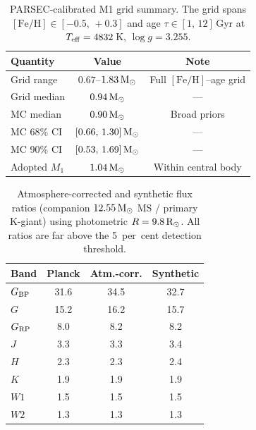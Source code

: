 \documentclass[usenatbib,fleqn]{mnras}
\newcommand{\Msun}{{\rm M}_\odot}
\newcommand{\Rsun}{{\rm R}_\odot}
\begin{document}

\begin{table}
\centering
\caption{PARSEC-calibrated M1 grid summary.  The grid spans
$[\mathrm{Fe/H}] \in [-0.5,\,+0.3]$ and age $\tau \in [1,\,12]\,$Gyr
at $T_{\rm eff} = 4832\,$K, $\log g = 3.255$.}
\label{tab:parsec_grid}
\begin{tabular}{lcc}
\toprule
Quantity & Value & Note \\
\midrule
Grid range       & $0.67$--$1.83\,\Msun$ & Full $[\mathrm{Fe/H}]$--age grid \\
Grid median      & $0.94\,\Msun$          & --- \\
MC median        & $0.90\,\Msun$          & Broad priors \\
MC 68\% CI       & $[0.66,\,1.30]\,\Msun$ & --- \\
MC 90\% CI       & $[0.53,\,1.69]\,\Msun$ & --- \\
Adopted $M_1$    & $1.04\,\Msun$          & Within central body \\
\bottomrule
\end{tabular}
\end{table}

\begin{table}
\centering
\caption{Atmosphere-corrected and synthetic flux ratios (companion
$12.55\,\Msun$ MS / primary K-giant) using photometric $R = 9.8\,\Rsun$.
All ratios are far above the 5~per~cent detection threshold.}
\label{tab:fluxratios}
\begin{tabular}{lccc}
\toprule
Band & Planck & Atm.-corr. & Synthetic \\
\midrule
$G_{\rm BP}$ & 31.6 & 34.5 & 32.7 \\
$G$          & 15.2 & 16.2 & 15.7 \\
$G_{\rm RP}$ & 8.0  & 8.2  & 8.2  \\
$J$          & 3.3  & 3.3  & 3.4  \\
$H$          & 2.3  & 2.3  & 2.4  \\
$K$          & 1.9  & 1.9  & 1.9  \\
$W1$         & 1.5  & 1.5  & 1.5  \\
$W2$         & 1.3  & 1.3  & 1.3  \\
\bottomrule
\end{tabular}
\end{table}
\end{document}
